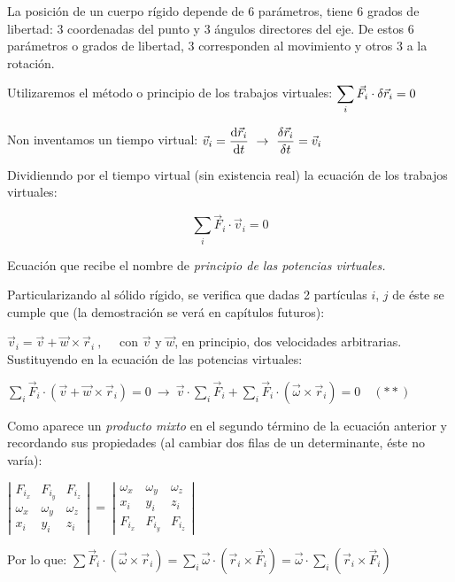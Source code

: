 La posición de un cuerpo rígido depende de $6$ parámetros, tiene $6$  grados de libertad: $3$ coordenadas del punto y $3$ ángulos directores del eje. De estos $6$ parámetros o grados de libertad, $3$ corresponden al movimiento y otros $3$ a la rotación.

Utilizaremos el método o principio de los trabajos virtuales: $\displaystyle \sum_i \vec F_i \cdot \var \vec r_i=0$

Non inventamos un tiempo virtual: $\displaystyle \vec v_i=\dv{\vec r_i}{t} \ \to \ \fdv{\vec r_i}{t}=\vec v_i$

Dividienndo por el tiempo virtual (sin existencia real) la ecuación de los trabajos virtuales:

\begin{equation}
 \sum_i\vec F_i\cdot \vec v_i=0	
\end{equation}

Ecuación que recibe el nombre de \emph{principio de las potencias virtuales.}

Particularizando al sólido rígido, se verifica que dadas 2 partículas $i$, $j$ de éste se cumple que (la demostración se verá en capítulos futuros):

$\vec v_i=\vec v+\vec w \times \vec r_i\ , \quad$
con $\vec v$ y $\vec w$, en principio, dos velocidades arbitrarias.
Sustituyendo en la ecuación de las potencias virtuales:

$\displaystyle \sum_i \vec F_i \cdot (\vec v+\vec w \times \vec r_i)=0 \ \to \ \vec v \cdot \sum_i \vec F_i + \sum_i \vec F_i \cdot (\vec \omega \times \vec r_i)=0 \quad (**)$

Como aparece un \emph{producto mixto} en el segundo término de la ecuación anterior y recordando sus propiedades (al cambiar dos filas de un determinante, éste no varía):

$\left| \begin{matrix} F_{i_x}&F_{i_y}&F_{i_z} \\ \omega_x&\omega_y&\omega_z \\ x_i&y_i&z_i \end{matrix} \right| \ = \ \left| \begin{matrix}\omega_x&\omega_y&\omega_z \\ x_i&y_i&z_i \\ F_{i_x}&F_{i_y}&F_{i_z} \end{matrix} \right|$

Por lo que: $\displaystyle \sum \vec F_i \cdot (\vec \omega \times \vec r_i) = \sum_i \vec \omega \cdot (\vec r_i \times \vec F_i) = \vec \omega \cdot \sum_i (\vec r_i \times \vec F_i) $


